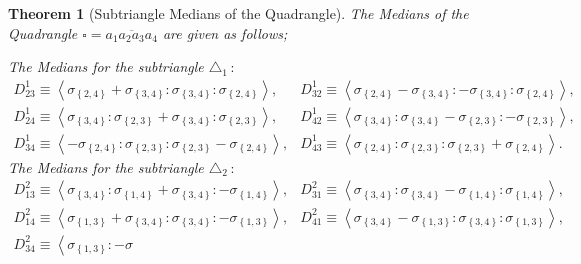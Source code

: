 \documentclass{unswthesis}
\newtheorem{theorem}{Theorem}
\begin{document}
\begin{theorem}[Subtriangle Medians of the Quadrangle]
The Medians of the Quadrangle $\square =\overline{a_{1}a_{2}a_{3}a_{4}}$ are
given as follows;

The Medians for the subtriangle $\triangle _{1}\,:$%
\begin{equation*}
\begin{array}{cc}
D_{23}^{1}\equiv \left\langle \sigma _{\left\{ 2,4\right\} }+\sigma
_{\left\{ 3,4\right\} }:\sigma _{\left\{ 3,4\right\} }:\sigma _{\left\{
2,4\right\} }\right\rangle , & D_{32}^{1}\equiv \left\langle \sigma
_{\left\{ 2,4\right\} }-\sigma _{\left\{ 3,4\right\} }:-\sigma _{\left\{
3,4\right\} }:\sigma _{\left\{ 2,4\right\} }\right\rangle , \\ 
D_{24}^{1}\equiv \left\langle \sigma _{\left\{ 3,4\right\} }:\sigma
_{\left\{ 2,3\right\} }+\sigma _{\left\{ 3,4\right\} }:\sigma _{\left\{
2,3\right\} }\right\rangle , & D_{42}^{1}\equiv \left\langle \sigma
_{\left\{ 3,4\right\} }:\sigma _{\left\{ 3,4\right\} }-\sigma _{\left\{
2,3\right\} }:-\sigma _{\left\{ 2,3\right\} }\right\rangle , \\ 
D_{34}^{1}\equiv \left\langle -\sigma _{\left\{ 2,4\right\} }:\sigma
_{\left\{ 2,3\right\} }:\sigma _{\left\{ 2,3\right\} }-\sigma _{\left\{
2,4\right\} }\right\rangle , & D_{43}^{1}\equiv \left\langle \sigma
_{\left\{ 2,4\right\} }:\sigma _{\left\{ 2,3\right\} }:\sigma _{\left\{
2,3\right\} }+\sigma _{\left\{ 2,4\right\} }\right\rangle .%
\end{array}%
\end{equation*}%
The Medians for the subtriangle $\triangle _{2}\,:$%
\begin{equation*}
\begin{array}{cc}
D_{13}^{2}\equiv \left\langle \sigma _{\left\{ 3,4\right\} }:\sigma
_{\left\{ 1,4\right\} }+\sigma _{\left\{ 3,4\right\} }:-\sigma _{\left\{
1,4\right\} }\right\rangle , & D_{31}^{2}\equiv \left\langle \sigma
_{\left\{ 3,4\right\} }:\sigma _{\left\{ 3,4\right\} }-\sigma _{\left\{
1,4\right\} }:\sigma _{\left\{ 1,4\right\} }\right\rangle , \\ 
D_{14}^{2}\equiv \left\langle \sigma _{\left\{ 1,3\right\} }+\sigma
_{\left\{ 3,4\right\} }:\sigma _{\left\{ 3,4\right\} }:-\sigma _{\left\{
1,3\right\} }\right\rangle , & D_{41}^{2}\equiv \left\langle \sigma
_{\left\{ 3,4\right\} }-\sigma _{\left\{ 1,3\right\} }:\sigma _{\left\{
3,4\right\} }:\sigma _{\left\{ 1,3\right\} }\right\rangle , \\ 
D_{34}^{2}\equiv \left\langle \sigma _{\left\{ 1,3\right\} }:-\sigma

\end{array}
\end{equation*}
\end{theorem}
\end{document}
